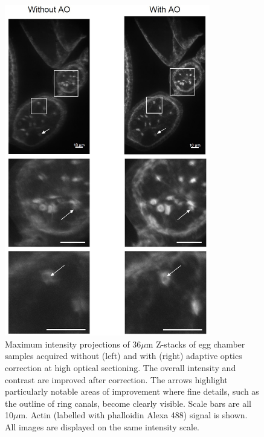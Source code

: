 \begin{figure}[h]
	\centering
	\includegraphics[width=0.8\textwidth]{images/Aurox_egg_chambers_composite.jpg}
	\caption[\textit{Drosophila} egg chamber data acquired on the Aurox imaging 
	system]{Maximum intensity projections of 36$\mu$m Z-stacks of egg 
		chamber samples acquired without (left) and with (right) adaptive 
		optics correction at high optical sectioning. The overall intensity 
		and contrast are improved after correction. The arrows highlight 
		particularly notable areas of improvement where fine details, such 
		as the outline of ring canals, become clearly visible. Scale bars 
		are all 10$\mu$m. Actin (labelled with phalloidin Alexa 488) signal 
		is shown. All images are displayed on the same intensity scale.}
	\label{fig:Aurox_egg_chambers_composite}
\end{figure}

